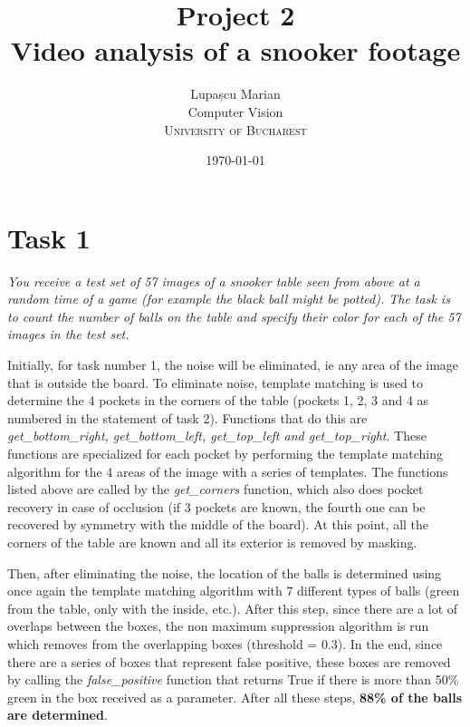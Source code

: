 \documentclass[12pt]{article}
\title{Project 2 \\
Video analysis of a snooker footage} %
\author{Lupașcu Marian\\ %
Computer Vision\\ %
\textsc{University of Bucharest}
}
\date{\today} %
\begin{document}
\setlength{\droptitle}{-5em}    

\maketitle



\section*{Task 1}

\emph{You receive a test set of 57 images of a snooker table seen from above at
a random time of a game (for example the black ball might be potted). The task is
to count the number of balls on the table and specify their color for each of the 57
images in the test set.}

Initially, for task number 1, the noise will be eliminated, ie any area of ​​the image that is 
outside the board. To eliminate noise, template matching is used to determine the 4 pockets in 
the corners of the table (pockets 1, 2, 3 and 4 as numbered in the statement of task 2). 
Functions that do this are \emph{get\_bottom\_right, get\_bottom\_left, get\_top\_left and get\_top\_right}. 
These functions are specialized for each pocket by performing the template matching algorithm 
for the 4 areas of the image with a series of templates. The functions listed above are called 
by the \emph{get\_corners} function, which also does pocket recovery in case of occlusion (if 3 pockets 
are known, the fourth one can be recovered by symmetry with the middle of the board). At this 
point, all the corners of the table are known and all its exterior is removed by masking. \par

Then, after eliminating the noise, the location of the balls is determined using once again the 
template matching algorithm with 7 different types of balls (green from the table, only with the 
inside, etc.). After this step, since there are a lot of overlaps between the boxes, the non 
maximum suppression algorithm is run which removes from the overlapping boxes (threshold = 0.3). 
In the end, since there are a series of boxes that represent false positive, these boxes are 
removed by calling the \emph{false\_positive} function that returns True if there is more than 50\% green 
in the box received as a parameter. After all these steps, 
\textbf{88\% of the balls are determined}. \par
\end{document}
